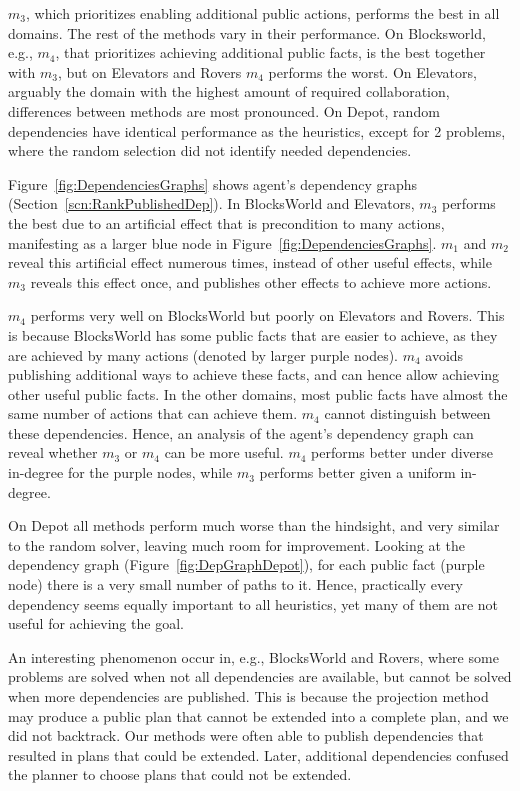 \documentclass{article}
\theoremstyle{remark}
\begin{document}
$m_3$, which prioritizes enabling additional public actions, performs the best in all domains. The rest of the methods vary in their performance. On Blocksworld, e.g., $m_4$, that prioritizes achieving additional public facts, is the best together with $m_3$, but on Elevators and Rovers $m_4$ performs the worst. On Elevators, arguably the domain with the highest amount of required collaboration, differences between methods are most pronounced. On Depot, random dependencies have identical performance as the heuristics, except for 2 problems, where the random selection did not identify needed dependencies.


Figure~\ref{fig:DependenciesGraphs} shows agent's dependency graphs  (Section~\ref{scn:RankPublishedDep}).
In BlocksWorld and Elevators, $m_3$ performs the best due to an artificial effect that is precondition to many actions, manifesting as a larger blue node in Figure~\ref{fig:DependenciesGraphs}. $m_1$ and $m_2$ reveal this artificial effect numerous times, instead of other useful effects, while $m_3$ reveals this effect once, and publishes other effects to achieve more actions.


$m_4$ performs very well on BlocksWorld but poorly on Elevators and Rovers. This is because BlocksWorld has some public facts that are easier to achieve, as they are achieved by many actions (denoted by larger purple nodes). $m_4$ avoids publishing additional ways to achieve these facts, and can hence allow achieving other useful public facts. In the other domains, most public facts have almost the same number of actions that can achieve them. $m_4$ cannot distinguish between these dependencies.
Hence, an analysis of the agent's dependency graph can reveal whether $m_3$ or $m_4$ can be more useful. $m_4$ performs better under diverse in-degree for the purple nodes, while $m_3$ performs better given a uniform in-degree.

On Depot all methods perform much worse than the hindsight, and very similar to the random solver, leaving much room for improvement.
Looking at the dependency graph (Figure~\ref{fig:DepGraphDepot}), for each public fact (purple node) there is a very small number of paths to it. Hence, practically every dependency seems equally important to all heuristics, yet many of them are not useful for achieving the goal.

An interesting phenomenon occur in, e.g., BlocksWorld and Rovers, where some problems are solved when not all dependencies are available, but cannot be solved when more dependencies are published. This is because the projection method may produce a public plan that cannot be extended into a complete plan, and we did not backtrack. Our methods were often able to publish dependencies that resulted in plans that could be extended. Later, additional dependencies confused the planner to choose plans that could not be extended.
\end{document}
